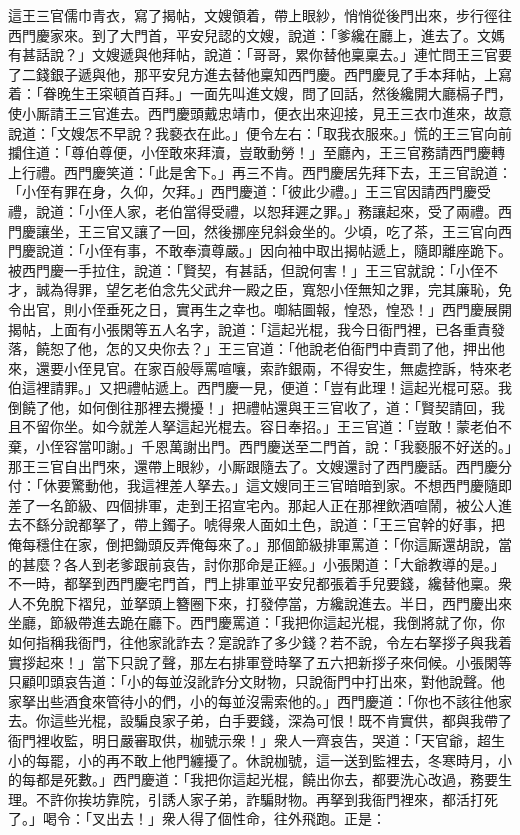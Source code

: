這王三官儒巾青衣，寫了揭帖，文嫂領着，帶上眼紗，悄悄從後門出來，步行徑往西門慶家來。到了大門首，平安兒認的文嫂，說道：「爹纔在廳上，進去了。文媽有甚話說？」文嫂遞與他拜帖，說道：「哥哥，累你替他稟稟去。」連忙問王三官要了二錢銀子遞與他，那平安兒方進去替他稟知西門慶。西門慶見了手本拜帖，上寫着：「眷晚生王寀頓首百拜。」一面先叫進文嫂，問了回話，然後纔開大廳槅子門，使小厮請王三官進去。西門慶頭戴忠靖巾，便衣出來迎接，見王三衣巾進來，故意說道：「文嫂怎不早說？我褻衣在此。」便令左右：「取我衣服來。」慌的王三官向前攔住道：「尊伯尊便，小侄敢來拜瀆，豈敢動勞！」至廳內，王三官務請西門慶轉上行禮。西門慶笑道：「此是舍下。」再三不肯。西門慶居先拜下去，王三官說道：「小侄有罪在身，{}久仰，欠拜。」西門慶道：「彼此少禮。」王三官因請西門慶受禮，說道：「小侄人家，老伯當得受禮，以恕拜遲之罪。」務讓起來，受了兩禮。西門慶讓坐，王三官又讓了一回，然後挪座兒斜僉坐的。少頃，吃了茶，王三官向西門慶說道：「小侄有事，不敢奉瀆尊嚴。」因向袖中取出揭帖遞上，隨即離座跪下。被西門慶一手拉住，說道：「賢契，{}有甚話，但說何害！」王三官就說：「小侄不才，誠為得罪，望乞老伯念先父武弁一殿之臣，寬恕小侄無知之罪，完其廉恥，免令出官，則小侄垂死之日，實再生之幸也。啣結圖報，惶恐，惶恐！」西門慶展開揭帖，上面有小張閑等五人名字，說道：「這起光棍，我今日衙門裡，已各重責發落，饒恕了他，怎的又央你去？」王三官道：「他說老伯衙門中責罰了他，押出他來，還要小侄見官。在家百般辱罵喧嚷，索詐銀兩，不得安生，無處控訴，特來老伯這裡請罪。」又把禮帖遞上。西門慶一見，便道：「豈有此理！這起光棍可惡。我倒饒了他，如何倒往那裡去攪擾！」把禮帖還與王三官收了，道：「賢契請回，我且不留你坐。如今就差人拏這起光棍去。容日奉招。」王三官道：「豈敢！蒙老伯不棄，小侄容當叩謝。」千恩萬謝出門。西門慶送至二門首，說：「我褻服不好送的。」那王三官自出門來，還帶上眼紗，小厮跟隨去了。文嫂還討了西門慶話。西門慶分付：「休要驚動他，我這裡差人拏去。」這文嫂同王三官暗暗到家。不想西門慶隨即差了一名節級、四個排軍，走到王招宣宅內。那起人正在那裡飲酒喧鬧，被公人進去不繇分說都拏了，帶上鐲子。唬得衆人面如土色，說道：「王三官幹的好事，把俺每穩住在家，倒把鋤頭反弄俺每來了。」{}那個節級排軍罵道：「你這厮還胡說，當的甚麼？各人到老爹跟前哀告，討你那命是正經。」小張閑道：「大爺教導的是。」不一時，都拏到西門慶宅門首，門上排軍並平安兒都張着手兒要錢，纔替他稟。衆人不免脫下褶兒，並拏頭上簪圈下來，打發停當，方纔說進去。半日，西門慶出來坐廳，節級帶進去跪在廳下。西門慶罵道：「我把你這起光棍，我倒將就了你，你如何指稱我衙門，往他家訛詐去？寔說詐了多少錢？若不說，令左右拏拶子與我着實拶起來！」當下只說了聲，那左右排軍登時拏了五六把新拶子來伺候。小張閑等只顧叩頭哀告道：「小的每並沒訛詐分文財物，只說衙門中打出來，對他說聲。他家拏出些酒食來管待小的們，小的每並沒需索他的。」{}西門慶道：「你也不該往他家去。你這些光棍，設騙良家子弟，白手要錢，深為可恨！既不肯實供，都與我帶了衙門裡收監，明日嚴審取供，枷號示衆！」衆人一齊哀告，哭道：「天官爺，超生小的每罷，小的再不敢上他門纏擾了。休說枷號，這一送到監裡去，冬寒時月，小的每都是死數。」西門慶道：「我把你這起光棍，饒出你去，都要洗心改過，務要生理。不許你挨坊靠院，引誘人家子弟，詐騙財物。{}再拏到我衙門裡來，都活打死了。」喝令：「叉出去！」衆人得了個性命，往外飛跑。正是：


